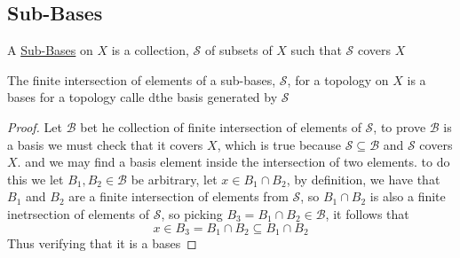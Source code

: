 \subsection{Sub-Bases}
\begin{definition}
    A \href{https://en.wikipedia.org/wiki/Subbase}{Sub-Bases} on $X$ is a collection, $\mathscr{S}$ of subsets of $X$ such that $\mathscr{S}$ covers $X$
\end{definition}
\begin{lemma}
    The finite intersection of elements of a sub-bases, $\mathscr{S}$, for a topology on $X$ is a bases for a topology calle dthe basis generated by $\mathscr{S}$
\end{lemma}
\begin{proof}
    Let $\mathscr{B}$ bet he collection of finite intersection of elements of $\mathscr{S}$, to prove $\mathscr{B}$ is a basis we must check that it covers $X$, which is true because $\mathscr{S}\subseteq\mathscr{B}$ and $\mathscr{S}$ covers $X$. and we may find a basis element inside the intersection of two elements. to do this we let $B_1,B_2\in\mathscr{B}$ be arbitrary, let $x\in B_1\cap B_2$, by definition, we have that $B_1$ and $B_2$ are a finite intersection of elements from $\mathscr{S}$, so $B_1\cap B_2$ is also a finite inetrsection of elements of $\mathscr{S}$, so picking $B_3=B_1\cap B_2\in\mathscr{B}$, it follows that
\[x\in B_3= B_1\cap B_2\subseteq B_1\cap B_2\]
Thus verifying that it is a bases
\end{proof}
